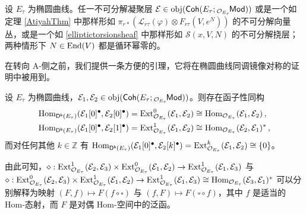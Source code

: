 \begin{Cor}\label{indecompocoherentonell}
	设 $E_\tau$ 为椭圆曲线。任一不可分解凝聚层 $\mathcal{E}\in\textup{obj}(\mathsf{Coh}(E_\tau;{}_{\mathcal{O}_{E_\tau}}\!\mathsf{Mod}))$ 或是一个如定理 \ref{AtiyahThm} 中那样形如 $\pi_{r*}(\mathcal{L}_{r\tau}(\varphi)\otimes F_{r\tau}(V,e^N))$ 的不可分解向量丛，或是一个如 \eqref{elliptictorsionsheaf} 中那样形如 $\mathcal{S}(x,V,N)$ 的不可分解挠层；两种情形下 $N\in\textup{End}(V)$ 都是循环幂零的。
\end{Cor}

在转向 A-侧之前，我们提供一条方便的引理，它将在椭圆曲线同调镜像对称的证明中被用到。

\begin{Lem}\label{ellSerreduality}
	设 $E_\tau$ 为椭圆曲线，$\mathcal{E}_1,\mathcal{E}_2\in\textup{obj}(\mathsf{Coh}(E_\tau;{}_{\mathcal{O}_{E_\tau}}\!\mathsf{Mod}))$。则存在函子性同构
	\begin{equation}
		\begin{aligned}
			&\textup{Hom}_{\mathsf{D^b}(E_\tau)}(\mathcal{E}_1[0]^\bullet,\mathcal{E}_2[0]^\bullet)=\textup{Ext}_{\mathcal{O}_{E_\tau}}^0(\mathcal{E}_1,\mathcal{E}_2)\cong\textup{Hom}_{\mathcal{O}_{E_\tau}}(\mathcal{E}_1,\mathcal{E}_2)\,, \\
			&\textup{Hom}_{\mathsf{D^b}(E_\tau)}(\mathcal{E}_1[0]^\bullet,\mathcal{E}_2[1]^\bullet)=\textup{Ext}_{\mathcal{O}_{E_\tau}}^1(\mathcal{E}_1,\mathcal{E}_2)\cong\textup{Hom}_{\mathcal{O}_{E_\tau}}(\mathcal{E}_2,\mathcal{E}_1)^*\,,
		\end{aligned}
	\end{equation}
	而对任何其他 $k\in\mathbb{Z}$ 有 $\textup{Hom}_{\mathsf{D^b}(E_\tau)}(\mathcal{E}_1[0]^\bullet,\mathcal{E}_2[k]^\bullet)=\textup{Ext}_{\mathcal{O}_{E_\tau}}^k(\mathcal{E}_1,\mathcal{E}_2)\cong\{0\}$。

	由此可知，$\diamond:\textup{Ext}_{\mathcal{O}_{E_\tau}}^1(\mathcal{E}_2,\mathcal{E}_3)\times\textup{Ext}_{\mathcal{O}_{E_\tau}}^0(\mathcal{E}_1,\mathcal{E}_2)\rightarrow \textup{Ext}_{\mathcal{O}_{E_\tau}}^1(\mathcal{E}_1,\mathcal{E}_3)$ 与 $\diamond:\textup{Ext}_{\mathcal{O}_{E_\tau}}^0(\mathcal{E}_2,\mathcal{E}_3)\times\textup{Ext}_{\mathcal{O}_{E_\tau}}^1(\mathcal{E}_1,\mathcal{E}_2)\rightarrow \textup{Ext}_{\mathcal{O}_{E_\tau}}^1(\mathcal{E}_1,\mathcal{E}_3)\cong\textup{Hom}_{\mathcal{O}_{E_\tau}}(\mathcal{E}_3,\mathcal{E}_1)^*$ 可以分别解释为映射 $(F,f)\mapsto F(f\circ\square)$ 与 $(f,F)\mapsto F(\square\circ f)$，其中 $f$ 是适当的 \textup{Hom}-态射，而 $F$ 是对偶 \textup{Hom}-空间中的泛函。
\end{Lem}

